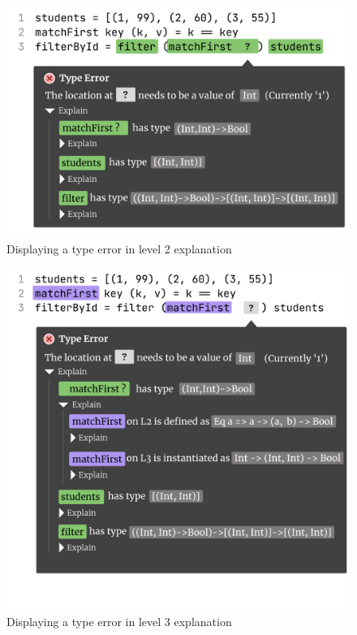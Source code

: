   \begin{figure}[hbt]
    \includegraphics[width=\linewidth]{Debugging-2}
    \caption{
        Displaying a type error in level 2 explanation
      }
  \end{figure}
  
  \begin{figure}[hbt]
    \includegraphics[width=\linewidth]{Debugging-3}
    \caption{
        Displaying a type error in level 3 explanation
      }
  \end{figure}
  

